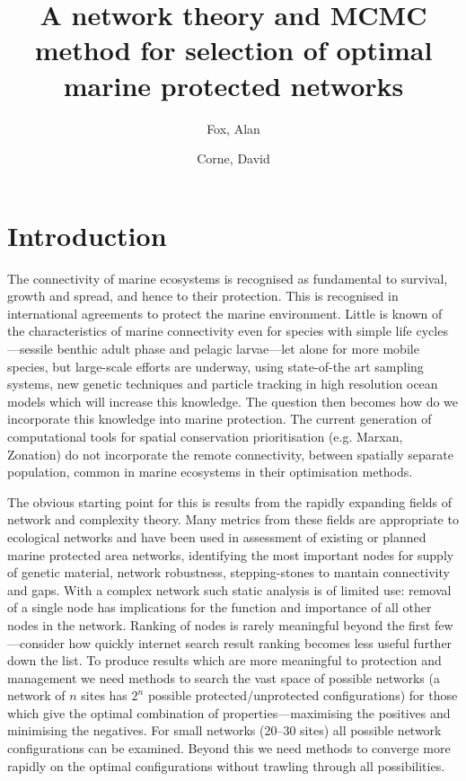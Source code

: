 \documentclass[11pt]{article} %
\title{A network theory and MCMC method for selection of optimal marine protected networks}
\author{Fox, Alan \and Corne, David}
\begin{document}
\maketitle

\section{Introduction}

The connectivity of marine ecosystems is recognised as fundamental to survival, growth and spread, and hence to their protection. This is recognised in international agreements to protect the marine environment. Little is known of the characteristics of marine connectivity even for species with simple life cycles---sessile benthic adult phase and pelagic larvae---let alone for more mobile species, but large-scale efforts are underway, using state-of-the art sampling systems, new genetic techniques and particle tracking in high resolution ocean models which will increase this knowledge. The question then becomes how do we incorporate this knowledge into marine protection. The current generation of computational tools for spatial conservation prioritisation (e.g. Marxan, Zonation) do not incorporate the remote connectivity, between spatially separate population, common in marine ecosystems in their optimisation methods.

The obvious starting point for this is results from the rapidly expanding fields of network and complexity theory. Many metrics from these fields are appropriate to ecological networks and have been used in assessment of existing or planned marine protected area networks, identifying the most important nodes for supply of genetic material, network robustness, stepping-stones to mantain connectivity and gaps. With a complex network such static analysis is of limited use: removal of a single node has implications for the function and importance of all other nodes in the network. Ranking of nodes is rarely meaningful beyond the first few---consider how quickly internet search result ranking becomes less useful further down the list. To produce results which are more meaningful to protection and management we need methods to search the vast space of possible networks (a network of $n$ sites has $2^n$ possible protected/unprotected configurations) for those which give the optimal combination of properties---maximising the positives and minimising the negatives. For small networks (20--30 sites) all possible network configurations can be examined. Beyond this we need methods to converge more rapidly on the optimal configurations without trawling through all possibilities.
\end{document}
